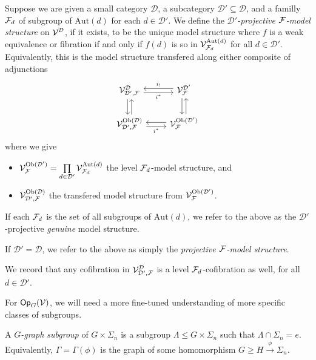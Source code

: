 \documentclass[a4paper,10pt]{article}%
\begin{document}
\begin{definition}
  \label{SUBD_PROJ_F_MODEL_STRUCTURE}
  Suppose we are given a small category $\mathcal D$, a subcategory $\mathcal D' \subseteq \mathcal D$, and a familly $\mathcal F_d$ of subgroup of $\mathrm{Aut}(d)$ for each $d\in \mathcal D'$. We define the \textit{$\mathcal D'$-projective $\mathcal F$-model structure} on $\mathcal V^{\mathcal D}$, if it exists, to be the unique model structure where $f$ is a weak equivalence or fibration if and only if $f(d)$ is so in $\mathcal V^{\mathrm{Aut}(d)}_{\mathcal F_d}$ for all $d\in \mathcal D'$. Equivalently, this is the model structure transfered along either composite of adjunctions
  \[
  \begin{tikzcd}
    \V^{\mathcal D}_{\mathcal D', \F} \arrow[d, shift right] \arrow[r, shift right, "i^*"'] & \V^{\mathcal D'}_\F \arrow[l, shift right, "i_!"'] \arrow[d, shift right]\\
    \V^{\mathrm{Ob}(\mathcal D)}_{\mathcal D', \F} \arrow[r, shift right, "i^*"'] \arrow[u, shift right] & \V^{\mathrm{Ob}(\mathcal D')}_{\F} \arrow[l, shift right] \arrow[u, shift right]
  \end{tikzcd}
  \]
  where we give
  \begin{itemize}
  \item $\mathcal V^{\mathrm{Ob}(\mathcal D')}_{\mathcal F} = \mathop{\prod}\limits_{d\in \mathcal D'}\mathcal V^{\mathrm{Aut}(d)}_{\mathcal F_d}$ the level $\mathcal F_d$-model structure, and
  \item $\mathcal V^{\mathrm{Ob}(\mathcal D)}_{\mathcal D', \mathcal F}$ the transfered model structure from $\mathcal V^{\mathrm{Ob}(\mathcal D')}_{\mathcal F}$.
  \end{itemize}
  
  If each $\mathcal F_d$ is the set of all subgroups of $\mathrm{Aut}(d)$, we refer to the above as the $\mathcal D'$-projective \textit{genuine} model structure. 

  If $\mathcal D' = \mathcal D$, we refer to the above as simply the \textit{projective $\mathcal F$-model structure}.
\end{definition}

\begin{remark}
  \label{LEVEL_COFIB_REMARK}
  We record that any cofibration in $\mathcal V^{\mathcal D}_{\mathcal D', \mathcal F}$ is a level $\mathcal F_d$-cofibration as well, for all $d\in \mathcal D'$. 
\end{remark}

For $\mathsf{Op}_G(\mathcal V)$, we will need a more fine-tuned understanding of more specific classes of subgroups.

\begin{definition} 
 A \textit{$G$-graph subgroup} of $G\times \Sigma_n$ is a subgroup $\Lambda \leq G\times \Sigma_n$ such that $\Lambda \cap \Sigma_n = e$. Equivalently, $\Gamma = \Gamma(\phi)$ is the graph of some homomorphism $G \geq H \xrightarrow{\phi} \Sigma_n$.  
\end{definition} 
\end{document}
